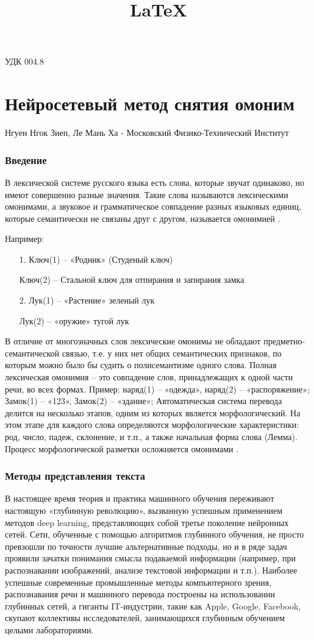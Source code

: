 \documentclass[12pt]{article}
\title{\LaTeX}
\date{}
\begin{document}
\def\dd#1#2{\frac{\partial#1}{\partial#2}}

{\large УДК 004.8}
\part*{Нейросетевый метод снятия омоним}
Нгуен Нгок Зиеп, Ле Мань Ха - Московский Физико-Технический Институт

\section{Введение}

В лексической системе русского языка есть слова, которые звучат одинаково, но имеют совершенно разные значения. Такие слова называются лексическими омонимами, а звуковое и грамматическое совпадение разных языковых единиц, которые семантически не связаны друг с другом, называется омонимией \cite{Homonym}.

Например:
\begin{itemize}
\item[1.] Ключ(1) – «Родник» (Студеный ключ)
\item[] Ключ(2) – Стальной ключ для отпирания и запирания замка
\item[2.] Лук(1) – «Растение» зеленый лук
\item[] Лук(2) – «оружие» тугой лук
\end{itemize}

В отличие от многозначных слов лексические омонимы не обладают предметно-семантической связью, т.е. у них нет общих семантических признаков, по которым можно было бы судить о полисемантизме одного слова. Полная лексическая омонимия – это совпадение слов, принадлежащих к одной части речи, во всех формах. Пример: наряд(1) – «одежда», наряд(2) – «распоряжение»; Замок(1) – «123», Замок(2) – «здание»; Автоматическая система перевода делится на несколько этапов, одним из которых является морфологический. На этом этапе для каждого слова определяются морфологические характеристики: род, число, падеж, склонение, и т.п., а также начальная форма слова (Лемма). Процесс морфологической разметки осложняется омонимами \cite{Homonym}.


\section{Методы представления текста}
В настоящее время теория и практика машинного обучения переживают настоящую «глубинную революцию», вызванную успешным применением методов deep learning, представляющих собой третье поколение нейронных сетей. Сети, обученные с помощью алгоритмов глубинного обучения, не просто превзошли по точности лучшие альтернативные подходы, но и в ряде задач проявили зачатки понимания смысла подаваемой информации (например, при распознавании изображений, анализе текстовой информации и т.п.). Наиболее успешные современные промышленные методы компьютерного зрения, распознавания речи и машинного перевода построены на использовании глубинных сетей, а гиганты IT-индустрии, такие как Apple, Google, Facebook, скупают коллективы исследователей, занимающихся глубинным обучением целыми лабораториями.
\end{document}
